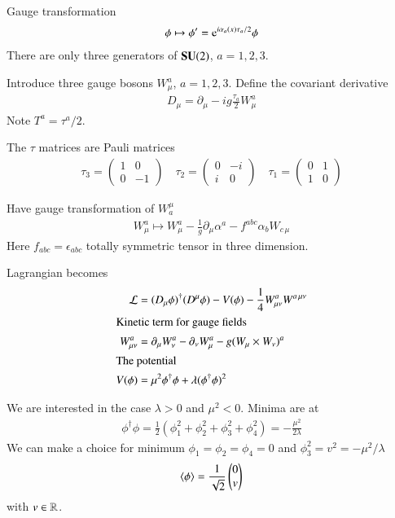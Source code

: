 Gauge transformation
\begin{align}
   \phi \mapsto \phi'=\mathrm{e}^{i\alpha_a(x) \tau_a / 2} \phi
\end{align}
There are only three generators of $\mathbf{SU}(2)$, $a=1,2,3$.

Introduce three gauge bosons $W_\mu^a$, $a=1,2,3$. Define the covariant derivative
\begin{align}
   D_\mu = \partial_\mu - ig \frac{\tau_a}{2} W_\mu^a
\end{align}
Note $T^a = {\tau^a} / {2}$.

The $\tau$ matrices are Pauli matrices
\begin{align}
   \tau_3 = \begin{pmatrix} 1 & 0 \\ 0 & -1\end{pmatrix}   \quad 
   \tau_2 = \begin{pmatrix} 0 & -i \\ i & 0\end{pmatrix} \quad
   \tau_1  = \begin{pmatrix} 0 & 1 \\ 1 & 0\end{pmatrix} 
\end{align}

Have gauge transformation of $W_a^\mu$
\begin{align}
W_\mu^a \mapsto W_\mu^a - \frac{1}{g} \partial_\mu \alpha^a - f^{abc} \alpha_b W_{c \,\mu} 
\end{align}
Here $f_{abc} = \epsilon_{abc}$ totally symmetric tensor in three dimension.

Lagrangian becomes
\begin{align}
   \mathcal{L} &= (D_\mu \phi)^\dagger (D^\mu \phi) - V(\phi) - \frac{1}{4} W_{\mu\nu}^a W^{a \, \mu\nu} \\
   \shortintertext{Kinetic term for gauge fields}
   W_{\mu\nu}^a &= \partial_\mu W_\nu^a - \partial_\nu W_\mu^a - g (W_\mu \times W_\nu)^a \\
   \shortintertext{The potential}
   V(\phi) &= \mu^2 \phi^\dagger \phi + \lambda (\phi^\dagger \phi)^2
\end{align}

We are interested in the case $\lambda > 0$ and $\mu^2 < 0$. Minima are at
\begin{align*}
   \phi^\dagger \phi = \frac{1}{2} \left( \phi_1^2 + \phi_2^2 + \phi_3^2 + \phi_4^2 \right) = - \frac{\mu^2}{2\lambda}
\end{align*}
We can make a choice for minimum $\phi_1 = \phi_2 = \phi_4 = 0$ and $\phi_3^2 = v^2 = - {\mu^2}/{\lambda}$ 
\begin{align}
   \expval{\phi} = \frac{1}{\sqrt{2}} \begin{pmatrix} 0 \\ v\end{pmatrix}
\end{align}
with $v \in \mathbb{R}$.

